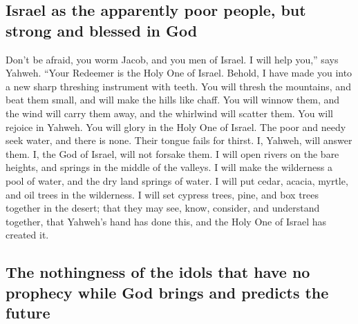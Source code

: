 \hypertarget{israel-as-the-apparently-poor-people-but-strong-and-blessed-in-god}{%
\subsection{Israel as the apparently poor people, but strong and blessed
in
God}\label{israel-as-the-apparently-poor-people-but-strong-and-blessed-in-god}}

 Don't be afraid, you worm Jacob, and you men of Israel.
I will help you,'' says Yahweh. ``Your Redeemer is the Holy One of
Israel.  Behold, I have made you into a new sharp
threshing instrument with teeth. You will thresh the mountains, and beat
them small, and will make the hills like chaff.  You will
winnow them, and the wind will carry them away, and the whirlwind will
scatter them. You will rejoice in Yahweh. You will glory in the Holy One
of Israel.  The poor and needy seek water, and there is
none. Their tongue fails for thirst. I, Yahweh, will answer them. I, the
God of Israel, will not forsake them.  I will open rivers
on the bare heights, and springs in the middle of the valleys. I will
make the wilderness a pool of water, and the dry land springs of water.
 I will put cedar, acacia, myrtle, and oil trees in the
wilderness. I will set cypress trees, pine, and box trees together in
the desert;  that they may see, know, consider, and
understand together, that Yahweh's hand has done this, and the Holy One
of Israel has created it.

\hypertarget{the-nothingness-of-the-idols-that-have-no-prophecy-while-god-brings-and-predicts-the-future}{%
\subsection{The nothingness of the idols that have no prophecy while God
brings and predicts the
future}\label{the-nothingness-of-the-idols-that-have-no-prophecy-while-god-brings-and-predicts-the-future}}

